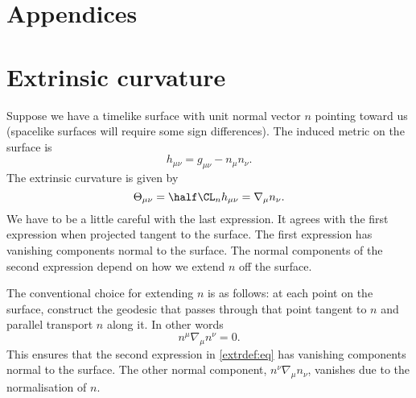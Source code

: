 \documentclass[12pt]{article}
\begin{document}



\section*{Appendices}
\appendix

\section{Extrinsic curvature}\label{sec:extrinsic}

Suppose we have a timelike surface with unit normal vector $n$ pointing toward us (spacelike surfaces will require some sign differences). The induced metric on the surface is
%
\begin{equation}\label{indmet:eq}
  h_{\mu\nu} = g_{\mu\nu} - n_\mu n_\nu.
\end{equation}
%
The extrinsic curvature is given by \cite{Wald-GeneRela:84}
%
\begin{equation}\label{extrdef:eq}
  \Theta_{\mu\nu} = \half \CL_n h_{\mu\nu} = \nabla_\mu n_\nu.
\end{equation}
%
We have to be a little careful with the last expression. It agrees with the first expression when projected tangent to the surface. The first expression has vanishing components normal to the surface. The normal components of the second expression depend on how we extend $n$ off the surface.

The conventional choice for extending $n$ is as follows: at each point on the surface, construct the geodesic that passes through that point tangent to $n$ and parallel transport $n$ along it. In other words
%
\begin{equation}\label{geodesic:eq}
  n^\mu \nabla_\mu n^\nu = 0.
\end{equation}
%
This ensures that the second expression in \eqref{extrdef:eq} has vanishing components normal to the surface. The other normal component, $n^\nu \nabla_\mu n_\nu$, vanishes due to the normalisation of $n$.
\end{document}
